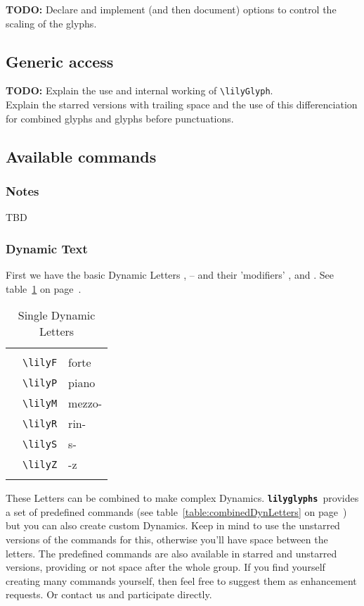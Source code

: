 \documentclass{article}
\newcommand{\lilyglyphs}{\texttt{\textbf{lilyglyphs }}}
\newcommand*{\cmd}[1]{\texttt{\textbackslash #1}}
\newcommand{\tmpCaption}{} %
\newcommand{\tmpLabel}{}
\newenvironment{reftable}[2]
	{%
		\renewcommand{\tmpCaption}{#1}
		\renewcommand{\tmpLabel}{#2}
		\begin{table}[ht]
		\begin{center}
		\begin{tabular}[t]{lll}
		\hline
		&\\
	}
	{%
		&\\
		\hline
		\end{tabular}
		\caption{\tmpCaption}
		\label{table:\tmpLabel}
		\end{center}
		\end{table}
	}
\begin{document}
\textbf{TODO:} Declare and implement (and then document) options to control the scaling of the glyphs.



\subsection{Generic access}
\textbf{TODO:} Explain the use and internal working of \cmd{lilyGlyph}.\\
Explain the starred versions with trailing space and the use of this differenciation for combined glyphs and glyphs before punctuations.



\subsection{Available commands}
\subsubsection{Notes}
TBD


\subsubsection{Dynamic Text}
First we have the basic Dynamic Letters \lilyP, \lilyF* -- and their 'modifiers'
\lilyM, \lilyS* and \lilyZ. See table~\ref{table:singleDynLetters} on page~\pageref{table:singleDynLetters}.

\begin{reftable}{Single Dynamic Letters}{singleDynLetters}
\lilyF* & \cmd{lilyF} & forte\\
\lilyP* & \cmd{lilyP} & piano\\
\lilyM* & \cmd{lilyM} & mezzo-\\
\lilyR* & \cmd{lilyR} & rin-\\
\lilyS* & \cmd{lilyS} & s-\\
\lilyZ* & \cmd{lilyZ} & -z\\
\end{reftable}

These Letters can be combined to make complex Dynamics. \lilyglyphs provides a set of predefined commands (see table~\ref{table:combinedDynLetters} on page~\pageref{table:combinedDynLetters}) but you can also create custom Dynamics. Keep in mind to use the unstarred versions of the commands for this, otherwise you'll have space between the letters. The predefined commands are also available in starred and unstarred versions, providing or not space after the whole group.
If you find yourself creating many commands yourself, then feel free to suggest them as enhancement requests. Or contact us and participate directly.
\end{document}
